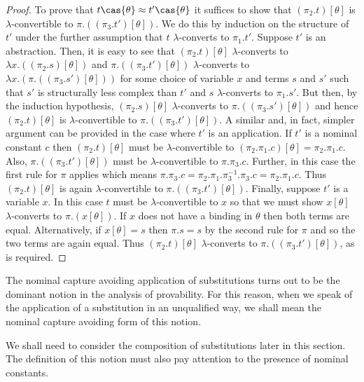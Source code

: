 \begin{proof}
To prove that $t\cas{\theta} \approx t'\cas{\theta}$ it suffices to
show that $(\pi_2.t)[\theta]$ is $\lambda$-convertible to
$\pi.((\pi_3.t')[\theta])$. We do this by induction on the structure
of $t'$ under the further assumption that $t$ $\lambda$-converts to
$\pi_1.t'$. Suppose $t'$ is an abstraction. Then, it is easy to see
that $(\pi_2.t)[\theta]$ $\lambda$-converts to $\lambda x.
((\pi_2.s)[\theta])$ and $\pi.((\pi_3.t')[\theta])$ $\lambda$-converts
to $\lambda x. (\pi.((\pi_3.s')[\theta]))$ for some choice of variable
$x$ and terms $s$ and $s'$ such that $s'$ is structurally less complex
than $t'$ and $s$ $\lambda$-converts to $\pi_1.s'$. But then, by the
induction hypothesis, $(\pi_2.s)[\theta]$ $\lambda$-converts to
$\pi.((\pi_3.s')[\theta])$ and hence $(\pi_2.t)[\theta]$ is
$\lambda$-convertible to $\pi.((\pi_3.t')[\theta])$. A similar and, in
fact, simpler argument can be provided in the case where $t'$ is an
application. If $t'$ is a nominal constant $c$ then
$(\pi_2.t)[\theta]$ must be $\lambda$-convertible to
$(\pi_2.\pi_1.c)[\theta] = \pi_2.\pi_1.c$. Also,
$\pi.((\pi_3.t')[\theta])$ must be $\lambda$-convertible to
$\pi.\pi_3.c$. Further, in this case the first rule for $\pi$ applies
which means $\pi.\pi_3.c = \pi_2.\pi_1.\pi_3^{-1}.\pi_3.c =
\pi_2.\pi_1.c$. Thus $(\pi_2.t)[\theta]$ is again
$\lambda$-convertible to $\pi.((\pi_3.t')[\theta])$. Finally, suppose
$t'$ is a variable $x$. In this case $t$ must be $\lambda$-convertible
to $x$ so that we must show $x[\theta]$ $\lambda$-converts to
$\pi.(x[\theta])$. If $x$ does not have a binding in $\theta$ then
both terms are equal. Alternatively, if $x[\theta] = s$ then $\pi.s =
s$ by the second rule for $\pi$ and so the two terms are again equal.
Thus $(\pi_2.t)[\theta]$ $\lambda$-converts to
$\pi.((\pi_3.t')[\theta])$, as is required.
\end{proof}

The nominal capture avoiding application of substitutions turns out to
be the dominant notion in the analysis of provability.
For this reason, when we speak of the application of a
substitution in an unqualified way, we shall mean the nominal capture
avoiding form of this notion.

We shall need to consider the composition of substitutions later in
this section. The definition of this notion must also pay attention to
the presence of nominal constants.

